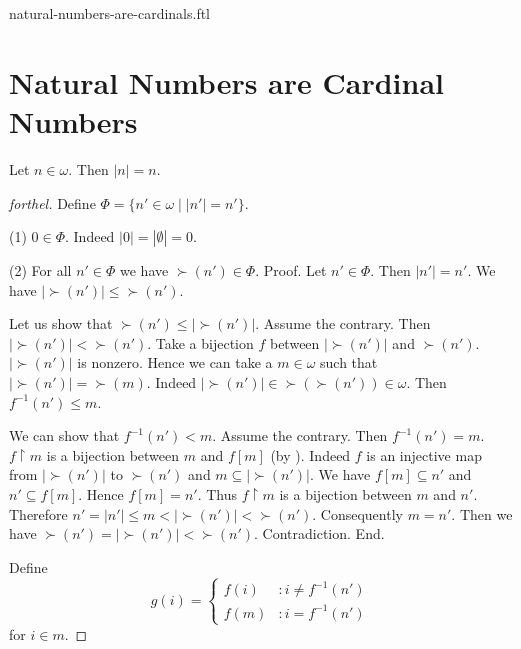 \documentclass{naproche-library}
\begin{document}
\begin{smodule}{natural-numbers-are-cardinals.ftl}

  \section*{Natural Numbers are Cardinal Numbers}

  \begin{theorem}[forthel,id=SET_THEORY_07_2948332552978432]
    Let $n \in \omega$.
    Then $|n| = n$.
  \end{theorem}
  \begin{proof}[forthel]
    Define $\Phi = \{ n' \in \omega \mid |n'| = n' \}$.

    (1) $0 \in \Phi$.
    Indeed $|0| = |\emptyset| = 0$.

    (2) For all $n' \in \Phi$ we have $\succ(n') \in \Phi$. \newline
    Proof.
      Let $n' \in \Phi$.
      Then $|n'| = n'$.
      We have $|\succ(n')| \leq \succ(n')$.

      Let us show that $\succ(n') \leq |\succ(n')|$.
        Assume the contrary.
        Then $|\succ(n')| < \succ(n')$.
        Take a bijection $f$ between $|\succ(n')|$ and $\succ(n')$.
        $|\succ(n')|$ is nonzero.
        Hence we can take a $m \in \omega$ such that $|\succ(n')| = \succ(m)$.
        Indeed $|\succ(n')| \in \succ(\succ(n')) \in \omega$.
        Then $f^{-1}(n') \leq m$.

        We can show that $f^{-1}(n') < m$.
          Assume the contrary.
          Then $f^{-1}(n') = m$.
          $f \restriction m$ is a bijection between $m$ and $f[m]$ (by ).
          Indeed $f$ is an injective map from $|\succ(n')|$ to $\succ(n')$ and
          $m \subseteq |\succ(n')|$.
          We have $f[m] \subseteq n'$ and $n' \subseteq f[m]$.
          Hence $f[m] = n'$.
          Thus $f \restriction m$ is a bijection between $m$ and $n'$.
          Therefore $n'
            = |n'|
            \leq m
            < |\succ(n')|
            < \succ(n')$.
          Consequently $m = n'$.
          Then we have $\succ(n') = |\succ(n')| < \succ(n')$.
          Contradiction.
        End.

        Define \[ g(i) =
          \begin{cases}
            f(i)  & : i \neq f^{-1}(n')
            \\
            f(m)  & : i = f^{-1}(n')
          \end{cases} \]
        for $i \in m$.


\end{proof}
\end{smodule}
\end{document}
